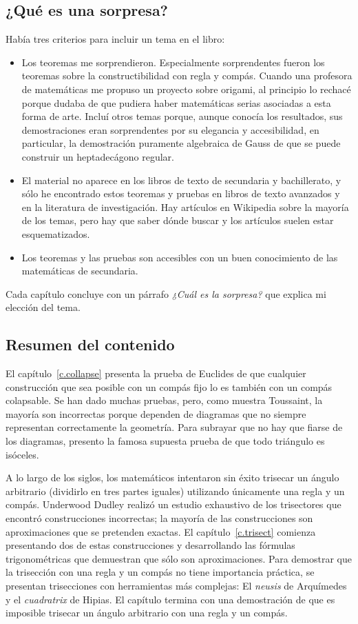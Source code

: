 \subsection*{¿Qué es una sorpresa?}

Había tres criterios para incluir un tema en el libro:
\begin{itemize}
\item Los teoremas me sorprendieron. Especialmente sorprendentes fueron los teoremas sobre la constructibilidad con regla y compás. Cuando una profesora de matemáticas me propuso un proyecto sobre origami, al principio lo rechacé porque dudaba de que pudiera haber matemáticas serias asociadas a esta forma de arte.
Incluí otros temas porque, aunque conocía los resultados, sus demostraciones eran sorprendentes por su elegancia y accesibilidad, en particular, la demostración puramente algebraica de Gauss de que se puede construir un heptadecágono regular.

\item El material no aparece en los libros de texto de secundaria y bachillerato, y sólo he encontrado estos teoremas y pruebas en libros de texto avanzados y en la literatura de investigación. Hay artículos en Wikipedia sobre la mayoría de los temas, pero hay que saber dónde buscar y los artículos suelen estar esquematizados.

\item Los teoremas y las pruebas son accesibles con un buen conocimiento de las matemáticas de secundaria.
\end{itemize}
Cada capítulo concluye con un párrafo \textit{¿Cuál es la sorpresa?} que explica mi elección del tema.

\subsection*{Resumen del contenido}

El capítulo~\ref{c.collapse} presenta la prueba de Euclides de que cualquier construcción que sea posible con un compás fijo lo es también con un compás colapsable. Se han dado muchas pruebas, pero, como muestra Toussaint, la mayoría son incorrectas porque dependen de diagramas que no siempre representan correctamente la geometría. Para subrayar que no hay que fiarse de los diagramas, presento la famosa supuesta prueba de que todo triángulo es isóceles. 

A lo largo de los siglos, los matemáticos intentaron sin éxito trisecar un ángulo arbitrario (dividirlo en tres partes iguales) utilizando únicamente una regla y un compás. Underwood Dudley realizó un estudio exhaustivo de los trisectores que encontró construcciones incorrectas; la mayoría de las construcciones son aproximaciones que se pretenden exactas. El capítulo~\ref{c.trisect} comienza presentando dos de estas construcciones y desarrollando las fórmulas trigonométricas que demuestran que sólo son aproximaciones. Para demostrar que la trisección con una regla y un compás no tiene importancia práctica, se presentan trisecciones con herramientas más complejas: El \emph{neusis} de Arquímedes y el \emph{cuadratrix} de Hipias. El capítulo termina con una demostración de que es imposible trisecar un ángulo arbitrario con una regla y un compás. 


